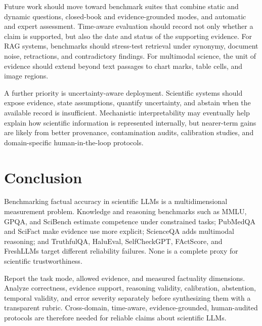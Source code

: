 \documentclass[manuscript,nonacm]{acmart}
\begin{document}
Future work should move toward benchmark suites that combine static and dynamic questions, closed-book and evidence-grounded modes, and automatic and expert assessment. Time-aware evaluation should record not only whether a claim is supported, but also the date and status of the supporting evidence. For RAG systems, benchmarks should stress-test retrieval under synonymy, document noise, retractions, and contradictory findings. For multimodal science, the unit of evidence should extend beyond text passages to chart marks, table cells, and image regions.

A further priority is uncertainty-aware deployment. Scientific systems should expose evidence, state assumptions, quantify uncertainty, and abstain when the available record is insufficient. Mechanistic interpretability may eventually help explain how scientific information is represented internally, but nearer-term gains are likely from better provenance, contamination audits, calibration studies, and domain-specific human-in-the-loop protocols.

\section{Conclusion}\label{sec:conclusion}
Benchmarking factual accuracy in scientific LLMs is a multidimensional measurement problem. Knowledge and reasoning benchmarks such as MMLU, GPQA, and SciBench estimate competence under constrained tasks; PubMedQA and SciFact make evidence use more explicit; ScienceQA adds multimodal reasoning; and TruthfulQA, HaluEval, SelfCheckGPT, FActScore, and FreshLLMs target different reliability failures. None is a complete proxy for scientific trustworthiness.

Report the task mode, allowed evidence, and measured factuality dimensions. Analyze correctness, evidence support, reasoning validity, calibration, abstention, temporal validity, and error severity separately before synthesizing them with a transparent rubric. Cross-domain, time-aware, evidence-grounded, human-audited protocols are therefore needed for reliable claims about scientific LLMs.

\begingroup
\scriptsize


\endgroup
\end{document}

